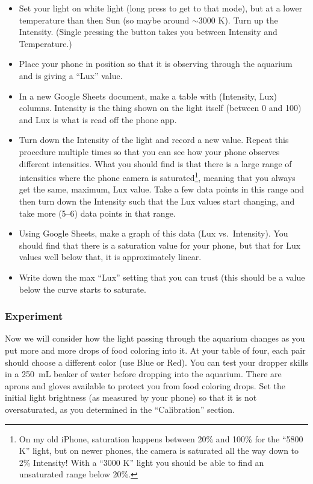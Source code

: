 	\begin{itemize}
	\item Set your light on white light (long press to get to that mode), but at a lower temperature than then Sun (so maybe around $\sim$3000 K). Turn up the Intensity.  (Single pressing the button takes you between Intensity and Temperature.)
	\item Place your phone in position so that it is observing through the aquarium and is giving a ``Lux'' value.
	\item In a new Google Sheets document, make a table with (Intensity, Lux) columns.  Intensity is the thing shown on the light itself (between 0 and 100) and Lux is what is read off the phone app.
	\item Turn down the Intensity of the light and record a new value.  Repeat this procedure multiple times so that you can see how your phone observes different intensities.  What you should find is that there is a large range of intensities where the phone camera is saturated\footnote{On my old iPhone, saturation happens between 20\% and 100\% for the ``5800 K'' light, but on newer phones, the camera is saturated all the way down to 2\% Intensity!  With a ``3000 K'' light you should be able to find an unsaturated range below 20\%.}, meaning that you always get the same, maximum, Lux value.  Take a few data points in this range and then turn down the Intensity such that the Lux values start changing, and take more (5--6) data points in that range.
	\item Using Google Sheets, make a graph of this data (Lux vs.\ Intensity).  You should find that there is a saturation value for your phone, but that for Lux values well below that, it is approximately linear.  
	\item Write down the max ``Lux'' setting that you can trust (this should be a value below the curve starts to saturate.
	\end{itemize}


\subsubsection{Experiment} %
Now we will consider how the light passing through the aquarium changes as you put more and more drops of food coloring into it.  At your table of four, each pair should choose a different color (use Blue or Red).  You can test your dropper skills in a 250~mL beaker of water before dropping into the aquarium.  There are aprons and gloves available to protect you from food coloring drops.  Set the initial light brightness (as measured by your phone) so that it is not oversaturated, as you determined in the ``Calibration'' section.\\[-6pt]

